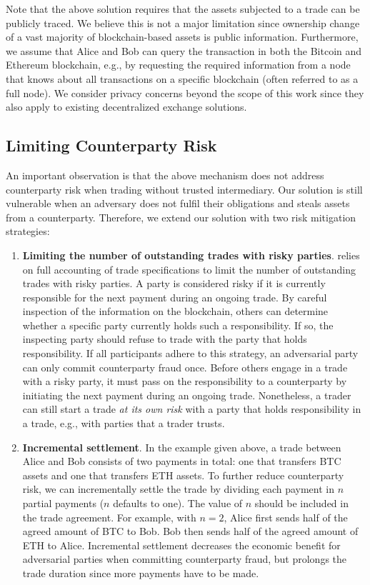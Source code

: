 Note that the above solution requires that the assets subjected to a trade can be publicly traced.
We believe this is not a major limitation since ownership change of a vast majority of blockchain-based assets is public information.
Furthermore, we assume that Alice and Bob can query the transaction in both the Bitcoin and Ethereum blockchain, e.g., by requesting the required information from a node that knows about all transactions on a specific blockchain (often referred to as a full node).
We consider privacy concerns beyond the scope of this work since they also apply to existing decentralized exchange solutions.

\subsection{Limiting Counterparty Risk}
\label{sec:limit_risk}
An important observation is that the above mechanism does not address counterparty risk when trading without trusted intermediary.
Our solution is still vulnerable when an adversary does not fulfil their obligations and steals assets from a counterparty.
Therefore, we extend our solution with two risk mitigation strategies:
\begin{enumerate}
	\item \textbf{Limiting the number of outstanding trades with risky parties}. \ModelName{} relies on full accounting of trade specifications to limit the number of outstanding trades with risky parties.
	A party is considered risky if it is currently responsible for the next payment during an ongoing trade.
	By careful inspection of the information on the \ModelName{} blockchain, others can determine whether a specific party currently holds such a responsibility.
	If so, the inspecting party should refuse to trade with the party that holds responsibility.
	If all participants adhere to this strategy, an adversarial party can only commit counterparty fraud once.
	Before others engage in a trade with a risky party, it must pass on the responsibility to a counterparty by initiating the next payment during an ongoing trade.
	Nonetheless, a trader can still start a trade \textit{at its own risk} with a party that holds responsibility in a trade, e.g., with parties that a trader trusts.
	\item \textbf{Incremental settlement}. In the example given above, a trade between Alice and Bob consists of two payments in total: one that transfers BTC assets and one that transfers ETH assets.
	To further reduce counterparty risk, we can incrementally settle the trade by dividing each payment in $ n $ partial payments ($ n $ defaults to one).
	The value of $ n $ should be included in the trade agreement.
	For example, with $ n = 2 $, Alice first sends half of the agreed amount of BTC to Bob.
	Bob then sends half of the agreed amount of ETH to Alice.
	Incremental settlement decreases the economic benefit for adversarial parties when committing counterparty fraud, but prolongs the trade duration since more payments have to be made.
\end{enumerate}

